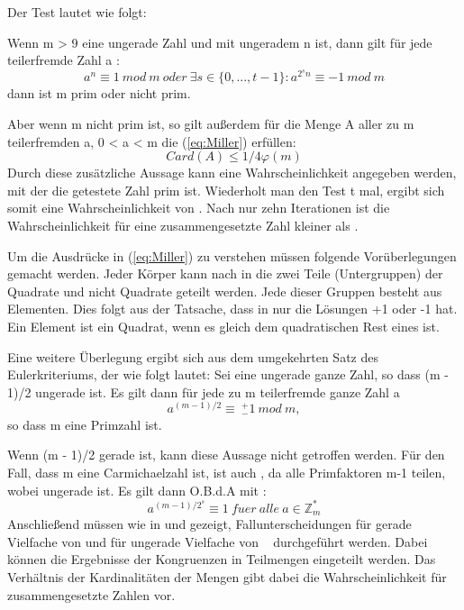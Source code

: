 		 Der Test lautet wie folgt:
		 
		 Wenn m \myin {} > 9  eine ungerade Zahl und  mit ungeradem n ist, dann gilt für jede teilerfremde Zahl a \myin {}:		 
	 	\begin{equation} \label{eq:Miller}
			a^n \equiv 1~mod~m~oder~\exists s \in \{0,..., t - 1\} : a^{2^sn} \equiv -1~mod~m
		\end{equation}
		dann ist m prim oder nicht prim.
		
		Aber wenn m nicht prim ist, so gilt außerdem für die Menge A aller zu m teilerfremden a, 0 < a < m die (\ref{eq:Miller}) erfüllen:
	 	\begin{displaymath}
		 	Card(A) \leq 1/4 \varphi(m)
	 	\end{displaymath}
	 	Durch diese zusätzliche Aussage kann eine Wahrscheinlichkeit angegeben werden, mit der die getestete Zahl prim ist. Wiederholt man den Test t mal, ergibt sich somit eine Wahrscheinlichkeit von . Nach nur zehn Iterationen ist die Wahrscheinlichkeit für eine zusammengesetzte Zahl kleiner als .
	 	
	 	Um die Ausdrücke in (\ref{eq:Miller}) zu verstehen müssen folgende Vorüberlegungen gemacht werden.
	 	Jeder Körper  kann nach \cite{Algorithmische:Zahlentheorie} in die zwei Teile (Untergruppen) der Quadrate und nicht Quadrate geteilt werden. Jede dieser Gruppen besteht aus  Elementen. Dies folgt aus der Tatsache, dass  in  nur die Lösungen +1 oder -1 hat. Ein Element ist ein Quadrat, wenn es gleich dem quadratischen Rest eines  ist.
	 	
	 	Eine weitere Überlegung ergibt sich aus dem umgekehrten Satz des Eulerkriteriums, der wie folgt lautet:
	 	Sei  eine ungerade ganze Zahl, so dass (m - 1)/2 ungerade ist.
	 	Es gilt dann für jede zu m teilerfremde ganze Zahl a
	 	\begin{displaymath}
		 	a^{(m-1)/2} \equiv~^+_-1~mod~m,
	 	\end{displaymath}
	 	so dass m eine Primzahl ist.
	 	
	 	Wenn (m - 1)/2 gerade ist, kann diese Aussage nicht getroffen werden. Für den Fall, dass m eine Carmichaelzahl ist, ist auch  , da alle Primfaktoren m-1 teilen, wobei  ungerade ist. Es gilt dann O.B.d.A mit :
 		\begin{displaymath}
	 		a^{(m-1)/2^s} \equiv1 ~fuer~alle~a \in \mathbb{Z}^*_m
 		\end{displaymath}
 		Anschließend müssen wie in \cite{Algorithmische:Zahlentheorie} und \cite{Algebraische:und:zahlentheoretische:Grundlagen:fuer:die:Informatik} gezeigt, Fallunterscheidungen für gerade Vielfache  von  und  für ungerade Vielfache  von ~ durchgeführt werden. Dabei können die Ergebnisse der Kongruenzen in Teilmengen eingeteilt werden. Das Verhältnis der Kardinalitäten der Mengen gibt dabei die Wahrscheinlichkeit für zusammengesetzte Zahlen vor.
 		
